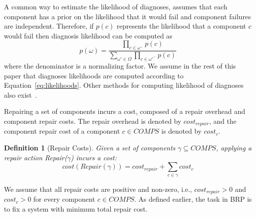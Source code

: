 \documentclass[review]{elsarticle}
\newtheorem{definition}{Definition}
\newcommand{\cost}{\textit{cost}}
\newcommand{\COMPS}{\textit{COMPS}}
\begin{document}
A common way to estimate the likelihood of diagnoses, assumes that each component has a prior on the likelihood that it would fail and component failures are independent. Therefore, if $p(c)$ represents the likelihood that a component $c$ would fail then diagnosis likelihood can be computed as
\begin{equation}
\displaystyle p(\omega)=\frac{\prod_{c\in\omega^{-}} p(c)}{\sum_{\omega'\in\Omega}{\prod_{c\in\omega'^{-}} p(c)}}
\label{eq:likelihoods}
\end{equation}
where the denominator is a normalizing factor. %
We assume in the rest of this paper that diagnoses likelihoods are computed according to Equation~\ref{eq:likelihoods}. Other methods for computing likelihood of diagnoses also exist~\cite{mengshoel2010probabilistic}.

Repairing a set of components incurs a cost, composed of a repair overhead and component repair costs. The repair overhead is denoted by $\cost_{repair}$, and the component repair cost of a component $c\in \COMPS$ is denoted by $\cost_{c}$.



\begin{definition}[Repair Costs]
Given a set of components $\gamma\subseteq \COMPS$, applying a repair action Repair($\gamma$) incurs a cost:
\[ \cost(Repair(\gamma)) = \cost_{repair} + \sum_{c\in \gamma} \cost_{c} \]
\end{definition}
We assume that all repair costs are positive and non-zero, i.e., $\cost_{repair}>0$ and $\cost_{c}>0$ for every component $c \in \COMPS$. As defined earlier, the task in BRP is to fix a system with minimum total repair cost.
\end{document}
